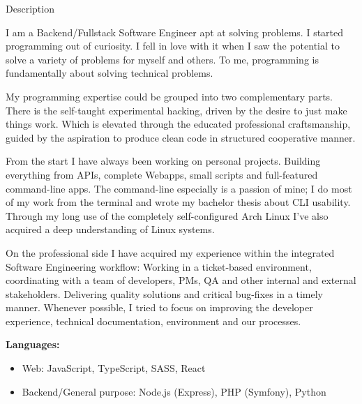 \documentclass{cv}
\begin{document}
\begin{rSection}{Description}

  \newcommand\skillWidth{0.48}
  \begin{minipage}[t]{\skillWidth\linewidth}

I am a Backend/Fullstack Software Engineer apt at solving problems.
I started programming out of curiosity.
I fell in love with it when I saw the potential to solve a variety of problems for myself and others.
To me, programming is fundamentally about solving technical problems.

\medskip

My programming expertise could be grouped into two complementary parts. There is
the self-taught experimental hacking, driven by the desire to just make things
work. Which is elevated through the educated professional craftsmanship, guided
by the aspiration to produce clean code in structured cooperative manner.

\medskip

From the start I have always been working on personal projects. Building
everything from APIs, complete Webapps, small scripts and full-featured
command-line apps. The command-line especially is a passion of mine;
I do most of my work from the terminal and wrote my bachelor thesis about CLI
usability.
Through my long use of the completely self-configured Arch Linux I've also
acquired a deep understanding of Linux systems.

\medskip

  \end{minipage}
  \hfill
  \begin{minipage}[t]{\skillWidth\linewidth}

    On the professional side I have acquired my experience within the integrated Software
    Engineering workflow: Working in a ticket-based environment, coordinating with a
    team of developers, PMs, QA and other internal and external stakeholders.
    Delivering quality solutions and critical bug-fixes in a timely manner.
    Whenever possible, I tried to focus on improving the developer experience,
    technical documentation, environment and our processes.

    \medskip

    \textbf{Languages:}
    \begin{itemize}
      \item Web: JavaScript, TypeScript, SASS, React
      \item Backend/General purpose: Node.js (Express), PHP (Symfony), Python
    \end{itemize}


\end{minipage}
\end{rSection}
\end{document}
